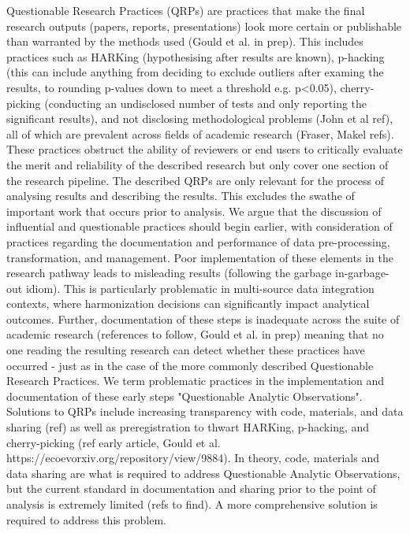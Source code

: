 \documentclass{article}
\begin{document}
Questionable Research Practices (QRPs) are practices that make the final research outputs (papers, reports, presentations) look more certain or publishable than warranted by the methods used (Gould et al. in prep). This includes practices such as HARKing (hypothesising after results are known), p-hacking (this can include anything from deciding to exclude outliers after examing the results, to rounding p-values down to meet a threshold e.g. p<0.05), cherry-picking (conducting an undisclosed number of tests and only reporting the significant results), and not disclosing methodological problems (John et al ref), all of which are prevalent across fields of academic research (Fraser, Makel refs). These practices obstruct the ability of reviewers or end users to critically evaluate the merit and reliability of the described research but only cover one section of the research pipeline. The described QRPs are only relevant for the process of analysing results and describing the results. This excludes the swathe of important work that occurs prior to analysis. We argue that the discussion of influential and questionable practices should begin earlier, with consideration of practices regarding the documentation and performance of data pre-processing, transformation, and management. Poor implementation of these elements in the research pathway leads to misleading results (following the garbage in-garbage-out idiom). This is particularly problematic in multi-source data integration contexts, where harmonization decisions can significantly impact analytical outcomes. Further, documentation of these steps is inadequate across the suite of academic research (references to follow, Gould et al. in prep) meaning that no one reading the resulting research can detect whether these practices have occurred - just as in the case of the more commonly described Questionable Research Practices. We term problematic practices in the implementation and documentation of these early steps "Questionable Analytic Observations". Solutions to QRPs include increasing transparency with code, materials, and data sharing (ref) as well as preregistration to thwart HARKing, p-hacking, and cherry-picking (ref early article, Gould et al. https://ecoevorxiv.org/repository/view/9884). In theory, code, materials and data sharing are what is required to address Questionable Analytic Observations, but the current standard in documentation and sharing prior to the point of analysis is extremely limited (refs to find). A more comprehensive solution is required to address this problem.
\end{document}

